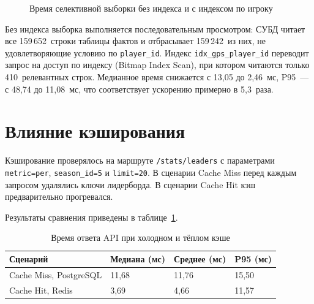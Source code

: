 \begin{figure}[H]
\centering
{}
\caption{Время селективной выборки без индекса и с индексом по игроку}
\label{fig:fact-indexes}
\end{figure}

Без индекса выборка выполняется последовательным просмотром: СУБД читает
все 159\,652~строки таблицы фактов и отбрасывает 159\,242~из них,
не удовлетворяющие условию по \texttt{player\_id}. Индекс
\texttt{idx\_gps\_player\_id} переводит запрос на доступ по индексу
(Bitmap Index Scan), при котором читаются только 410~релевантных строк.
Медианное время снижается с 13{,}05 до 2{,}46~мс, P95~--- с 48{,}74
до 11{,}08~мс, что соответствует ускорению примерно в 5{,}3~раза.

\section{Влияние кэширования}

Кэширование проверялось на маршруте \texttt{/stats/leaders} с параметрами
\texttt{metric=per}, \texttt{season\_id=5} и \texttt{limit=20}. В сценарии
Cache Miss перед каждым запросом удалялись ключи лидерборда. В сценарии
Cache Hit кэш предварительно прогревался.

Результаты сравнения приведены в таблице~\ref{tab:cache-effect}.

\begin{table}[H]
\caption{Время ответа API при холодном и тёплом кэше}
\label{tab:cache-effect}
\centering
\small
\begin{tabular}{|p{}|p{}|p{}|p{}|}
\hline
\textbf{Сценарий} & \textbf{Медиана (мс)}
  & \textbf{Среднее (мс)} & \textbf{P95 (мс)} \\
\hline
Cache Miss, PostgreSQL & 11{,}68 & 11{,}76 & 15{,}50 \\
\hline
Cache Hit, Redis & 3{,}69 & 4{,}66 & 11{,}57 \\
\hline
\end{tabular}
\end{table}

